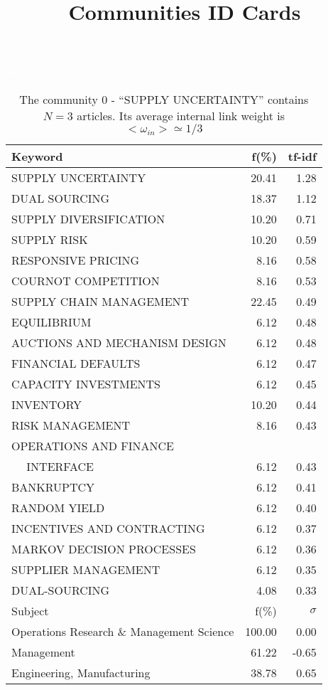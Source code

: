 \documentclass[a4paper,11pt]{report}
\title{{\bf Communities ID Cards}}
\date{\begin{flushleft}This document gather the ``ID Cards'' of the CC communities found within your database.\\
 The CC network was built by keeping a link between articles sharing at least 5 references. The communities characterized here correspond to the ones found in the level 0 (in the sense of the Louvain algo) which gathers more than 0 articles.\\
 These ID cards displays the most frequent keywords, subject categories, journals of publication, institution, countries, authors, references and reference journals of the articles of each community. The significance of an item $\sigma = \sqrt{N} (f - p) / \sqrt{p(1-p)}$ [where $N$ is the number of articles within the community and $f$ and $p$ are the proportion of articles respectively within the community and within the database displaying that item ] is also given (for example $\sigma > 5$ is really highly significant). The tf-idf value which can be calculated by $tf-idf = f*log(frac{1}{p})$ is also given.\\
\vspace{1cm}
\copyright Sebastian Grauwin, Liu Weizhi - (2014) \end{flushleft}}
\begin{document}
\begin{landscape}
\maketitle
\clearpage

\begin{table}[!ht]
\caption{The community 0 - ``SUPPLY UNCERTAINTY'' contains $N = 3$ articles. Its average internal link weight is $<\omega_{in}> \simeq 1/3$ }
\textcolor{white}{aa}\\
{\scriptsize\begin{tabular}{|l r  r|}
\hline
Keyword & f(\%) & tf-idf \\
\hline
SUPPLY UNCERTAINTY & 20.41 & 1.28\\
DUAL SOURCING & 18.37 & 1.12\\
SUPPLY DIVERSIFICATION & 10.20 & 0.71\\
SUPPLY RISK & 10.20 & 0.59\\
RESPONSIVE PRICING & 8.16 & 0.58\\
COURNOT COMPETITION & 8.16 & 0.53\\
SUPPLY CHAIN MANAGEMENT & 22.45 & 0.49\\
EQUILIBRIUM & 6.12 & 0.48\\
AUCTIONS AND MECHANISM DESIGN & 6.12 & 0.48\\
FINANCIAL DEFAULTS & 6.12 & 0.47\\
CAPACITY INVESTMENTS & 6.12 & 0.45\\
INVENTORY & 10.20 & 0.44\\
RISK MANAGEMENT & 8.16 & 0.43\\
OPERATIONS AND FINANCE &  &\\
$\quad$ INTERFACE & 6.12 & 0.43\\
BANKRUPTCY & 6.12 & 0.41\\
RANDOM YIELD & 6.12 & 0.40\\
INCENTIVES AND CONTRACTING & 6.12 & 0.37\\
MARKOV DECISION PROCESSES & 6.12 & 0.36\\
SUPPLIER MANAGEMENT & 6.12 & 0.35\\
DUAL-SOURCING & 4.08 & 0.33\\
\hline
\hline
Subject & f(\%) & $\sigma$\\
\hline
Operations Research \& Management Science & 100.00 & 0.00\\
Management & 61.22 & -0.65\\
Engineering, Manufacturing & 38.78 & 0.65\\

\end{tabular}}
\end{table}
\end{landscape}
\end{document}
